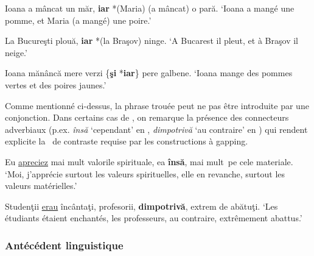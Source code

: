 \ea
\ea Ioana a mâncat un măr, \textbf{iar} *(Maria) (a mâncat) o pară. \label{ch2:ex55a}
\glt ‘Ioana a mangé une pomme, et Maria (a mangé) une poire.’   

\ex La Bucureşti plouă, \textbf{iar} *(la Braşov) ninge. \label{ch2:ex55b}
\glt ‘A Bucarest il pleut, et à Braşov il neige.’  

\ex Ioana mănâncă mere verzi \{\textbf{şi} {\textbar} *\textbf{iar}\} pere galbene. \label{ch2:ex55c}
\glt ‘Ioana mange des pommes vertes et des poires jaunes.’  
\z
\z

Comme mentionné ci-dessus, la phrase trouée peut ne pas être introduite par une conjonction. Dans certains cas de , on remarque la présence des connecteurs adverbiaux (p.ex. \textit{însă} ‘cependant’ en , \textit{dimpotrivă} ‘au contraire’ en ) qui rendent explicite la ~de contraste requise par les constructions à gapping.


\ea \label{ch2:ex56}
\ea Eu \uline{apreciez} mai mult valorile spirituale, ea \textbf{însă}, mai mult~pe cele materiale. \label{ch2:ex56a} 
\glt ‘Moi, j’apprécie surtout les valeurs spirituelles, elle en revanche, surtout les valeurs matérielles.’   

\ex Studenţii \uline{erau} încântaţi, profesorii, \textbf{dimpotrivă}, extrem de abătuţi. \label{ch2:ex56b}
\glt ‘Les étudiants étaient enchantés, les professeurs, au contraire, extrêmement abattus.’
\z
\z


\subsubsection{Antécédent linguistique} 


